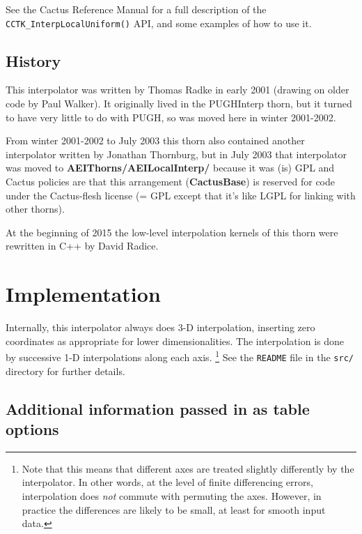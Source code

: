 See the Cactus Reference Manual
for a full description of the \verb|CCTK_InterpLocalUniform()| API,
and some examples of how to use it.


\subsection{History}

This interpolator was written by Thomas Radke in early 2001 (drawing
on older code by Paul Walker).  It originally lived in the PUGHInterp
thorn, but it turned to have very little to do with PUGH, so was moved
here in winter 2001-2002.

From winter 2001-2002 to July 2003 this thorn also contained another
interpolator written by Jonathan Thornburg, but in July 2003 that
interpolator was moved to {\bf AEIThorns/AEILocalInterp/} because it was
(is) GPL and Cactus policies are that this arrangement ({\bf CactusBase})
is reserved for code under the Cactus-flesh license (= GPL except
that it's like LGPL for linking with other thorns).

At the beginning of 2015 the low-level interpolation kernels of this
thorn were rewritten in C++ by David Radice.

\section{Implementation}

Internally, this interpolator always does 3-D interpolation, inserting
zero coordinates as appropriate for lower dimensionalities.  The
interpolation is done by successive 1-D interpolations along each
axis.%
\footnote{%
	 Note that this means that different axes are treated
	 slightly differently by the interpolator.  In other
	 words, at the level of finite differencing errors,
	 interpolation does {\em not\/} commute with permuting
	 the axes.  However, in practice the differences are
	 likely to be small, at least for smooth input data.
	 }%
{}  See the \verb|README| file in the \verb|src/| directory
for further details.

\subsection{Additional information passed in as table options}

